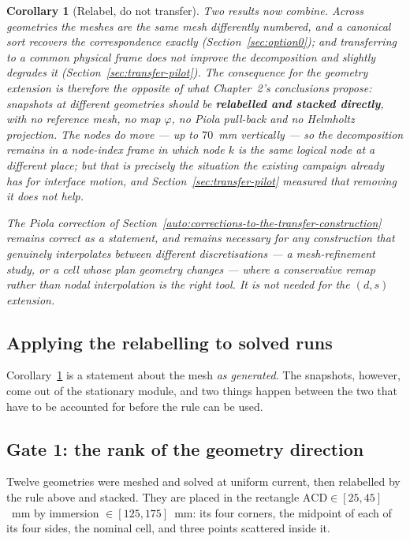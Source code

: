 \documentclass[11pt,a4paper]{article}
\theoremstyle{plain}
\newtheorem{corollary}[proposition]{Corollary}
\theoremstyle{definition}
\theoremstyle{remark}
\begin{document}
\begin{corollary}[Relabel, do not transfer]
\label{cor:relabel-not-transfer}
Two results now combine. Across geometries the meshes are the same mesh
differently numbered, and a canonical sort recovers the correspondence exactly
(Section~\ref{sec:option0}); and transferring to a common \emph{physical}
frame does not improve the decomposition and slightly degrades it
(Section~\ref{sec:transfer-pilot}). The consequence for the geometry extension is
therefore the opposite of what Chapter~2's conclusions propose: snapshots at
different geometries should be \textbf{relabelled and stacked directly}, with no
reference mesh, no map $\varphi$, no Piola pull-back and no Helmholtz
projection. The nodes do move --- up to $70$~mm vertically --- so the
decomposition remains in a node-index frame in which node $k$ is the same
\emph{logical} node at a different place; but that is precisely the situation the
existing campaign already has for interface motion, and
Section~\ref{sec:transfer-pilot} measured that removing it does not help.

The Piola correction of Section~\ref{auto:corrections-to-the-transfer-construction}
remains correct as a statement, and remains necessary for any construction that
genuinely interpolates between \emph{different} discretisations --- a
mesh-refinement study, or a cell whose plan geometry changes --- where a
conservative remap \cite{farrell} rather than nodal interpolation is the right
tool. It is not needed for the $(d,s)$ extension.
\end{corollary}

\subsection{Applying the relabelling to solved runs}
\label{sec:relabel-solved}

Corollary~\ref{cor:relabel-not-transfer} is a statement about the mesh
\emph{as generated}. The snapshots, however, come out of the stationary module,
and two things happen between the two that have to be accounted for before the
rule can be used.

\label{meas:pilot12}
\subsection{Gate 1: the rank of the geometry direction}
\label{sec:gate1}

Twelve geometries were meshed and solved at uniform current, then relabelled by
the rule above and stacked. They are placed in the rectangle
$\mathrm{ACD}\in[25,45]$~mm by immersion $\in[125,175]$~mm: its four corners,
the midpoint of each of its four sides, the nominal cell, and three points
scattered inside it.
\end{document}

